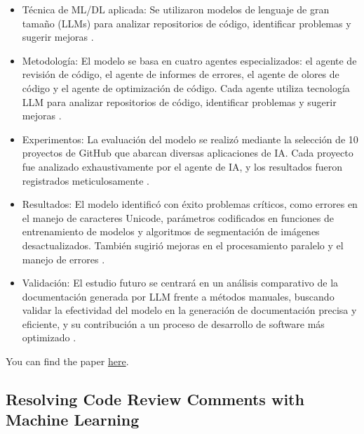 \documentclass{article}
\begin{document}
\begin{itemize}
    \item Técnica de ML/DL aplicada: Se utilizaron modelos de lenguaje de gran tamaño (LLMs) para analizar repositorios de código, identificar problemas y sugerir mejoras \cite{Rasheed_etal}.
    \item Metodología: El modelo se basa en cuatro agentes especializados: el agente de revisión de código, el agente de informes de errores, el agente de olores de código y el agente de optimización de código. Cada agente utiliza tecnología LLM para analizar repositorios de código, identificar problemas y sugerir mejoras \cite{Rasheed_etal}.
    \item Experimentos: La evaluación del modelo se realizó mediante la selección de 10 proyectos de GitHub que abarcan diversas aplicaciones de IA. Cada proyecto fue analizado exhaustivamente por el agente de IA, y los resultados fueron registrados meticulosamente \cite{Rasheed_etal}.
    \item Resultados: El modelo identificó con éxito problemas críticos, como errores en el manejo de caracteres Unicode, parámetros codificados en funciones de entrenamiento de modelos y algoritmos de segmentación de imágenes desactualizados. También sugirió mejoras en el procesamiento paralelo y el manejo de errores \cite{Rasheed_etal}.
    \item Validación: El estudio futuro se centrará en un análisis comparativo de la documentación generada por LLM frente a métodos manuales, buscando validar la efectividad del modelo en la generación de documentación precisa y eficiente, y su contribución a un proceso de desarrollo de software más optimizado \cite{Rasheed_etal}.
\end{itemize}

You can find the paper \href{https://arxiv.org/pdf/2404.18496}{here}.

\subsection{Resolving Code Review Comments with Machine Learning \cite{Google_etal}}
\end{document}
